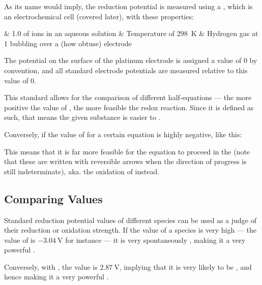		As its name would imply, the  reduction potential is measured using a , which is
		an electrochemical cell (covered later), with these properties:

		\begin{bulletlist}
			& \SI{1.0}{\molarConc} of  ions in an aqueous solution
			& Temperature of \SI{298}{\kelvin}
			& Hydrogen gas at \SI{1}{\atm} bubbling over a  (how obtuse) electrode
		\end{bulletlist}

		The potential on the surface of the platinum electrode is assigned a value of $0$ by convention, and all standard electrode
		potentials are measured relative to this value of $0$.

		This standard allows for the comparison of different half-equations --- the more positive the value of \Eo{}, the more
		feasible the redox reaction. Since it is defined as such, that means the given substance is easier to .

		Conversely, if the value of \Eo{} for a certain equation is highly negative, like this:


		This means that it is far more feasible for the equation to proceed in the  (note that these are
		written with reversible arrows when the direction of progress is still indeterminate), aka. the oxidation of  instead.


		\subsection{Comparing \texorpdfstring{\Eo{}}{E°} Values}

			Standard reduction potential values of different species can be used as a judge of their reduction or oxidation strength.
			If the \Eo{} value of a species is very high --- the \Eo{} value of  is $\SI{-3.04}{\volt}$ for instance --- it
			is very spontaneously , making it a very powerful .

			Conversely, with , the \Eo{} value is $\SI{+2.87}{\volt}$, implying that it is very likely to be , and hence
			making it a very powerful .

